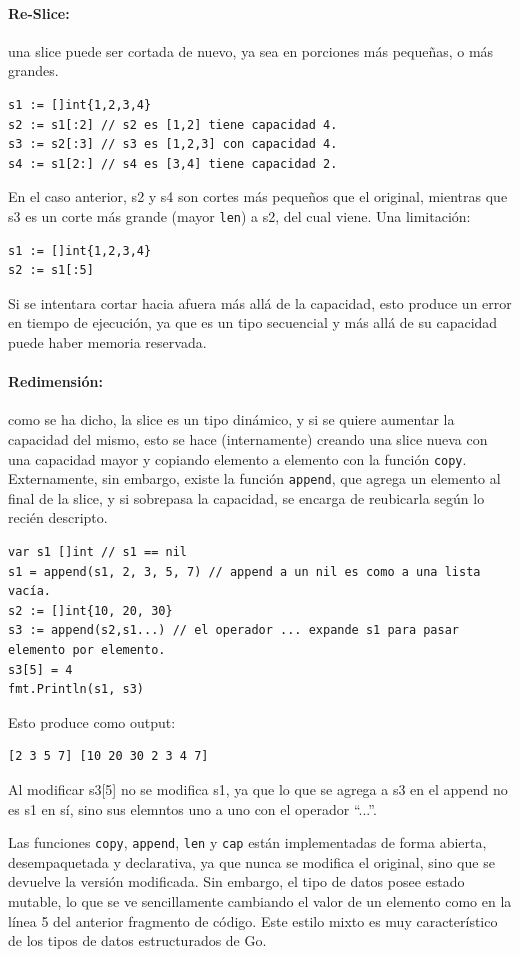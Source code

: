 \documentclass{article}
\begin{document}
\paragraph{Re-Slice:} una slice puede ser cortada de nuevo, ya sea en porciones más pequeñas, o más grandes.
\begin{lstlisting}[caption = cortando hacia derecha o hacia izquierda.]
s1 := []int{1,2,3,4}
s2 := s1[:2] // s2 es [1,2] tiene capacidad 4.
s3 := s2[:3] // s3 es [1,2,3] con capacidad 4.
s4 := s1[2:] // s4 es [3,4] tiene capacidad 2.
\end{lstlisting}
En el caso anterior, s2 y s4 son cortes más pequeños que el original, mientras que s3 es un corte más grande (mayor \lstinline|len|) a s2, del cual viene. Una limitación:
\begin{lstlisting}[caption = re-slice ilegal.]
s1 := []int{1,2,3,4}
s2 := s1[:5]
\end{lstlisting}
Si se intentara cortar hacia afuera más allá de la capacidad, esto produce un error en tiempo de ejecución, ya que es un tipo secuencial y más allá de su capacidad puede haber memoria reservada.

\paragraph{Redimensión:} como se ha dicho, la slice es un tipo dinámico, y si se quiere aumentar la capacidad del mismo, esto se hace (internamente) creando una slice nueva con una capacidad mayor y copiando elemento a elemento\cite{slices} con la función \lstinline|copy|. Externamente, sin embargo, existe la función \lstinline|append|, que agrega un elemento al final de la slice, y si sobrepasa la capacidad, se encarga de reubicarla según lo recién descripto.
\begin{lstlisting}[caption = append]
var s1 []int // s1 == nil
s1 = append(s1, 2, 3, 5, 7) // append a un nil es como a una lista vacía.
s2 := []int{10, 20, 30}
s3 := append(s2,s1...) // el operador ... expande s1 para pasar elemento por elemento.
s3[5] = 4
fmt.Println(s1, s3)
\end{lstlisting}
Esto produce como output:
\begin{verbatim}
[2 3 5 7] [10 20 30 2 3 4 7]
\end{verbatim}
Al modificar s3[5] no se modifica s1, ya que lo que se agrega a s3 en el append no es s1 en sí, sino sus elemntos uno a uno con el operador ``...''.

Las funciones \lstinline|copy|, \lstinline|append|, \lstinline|len| y \lstinline|cap| están implementadas de forma abierta, desempaquetada y declarativa, ya que nunca se modifica el original, sino que se devuelve la versión modificada. Sin embargo, el tipo de datos posee estado mutable, lo que se ve sencillamente cambiando el valor de un elemento como en la línea 5 del anterior fragmento de código. Este estilo mixto es muy característico de los tipos de datos estructurados de Go.
\end{document}
